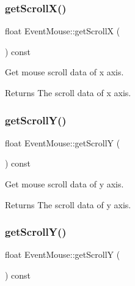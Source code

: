 \subsubsection{\texorpdfstring{get\+Scroll\+X()}{getScrollX()}\hspace{0.1cm}{\footnotesize\ttfamily [2/2]}}
{\footnotesize\ttfamily float Event\+Mouse\+::get\+ScrollX (\begin{DoxyParamCaption}{ }\end{DoxyParamCaption}) const\hspace{0.3cm}{\ttfamily [inline]}}

Get mouse scroll data of x axis.

\begin{DoxyReturn}{Returns}
The scroll data of x axis. 
\end{DoxyReturn}
\mbox{\label{classEventMouse_ad0670c5295d1972f2b9ccb85d9d23849}} 
\subsubsection{\texorpdfstring{get\+Scroll\+Y()}{getScrollY()}\hspace{0.1cm}{\footnotesize\ttfamily [1/2]}}
{\footnotesize\ttfamily float Event\+Mouse\+::get\+ScrollY (\begin{DoxyParamCaption}{ }\end{DoxyParamCaption}) const\hspace{0.3cm}{\ttfamily [inline]}}

Get mouse scroll data of y axis.

\begin{DoxyReturn}{Returns}
The scroll data of y axis. 
\end{DoxyReturn}
\mbox{\label{classEventMouse_ad0670c5295d1972f2b9ccb85d9d23849}} 
\subsubsection{\texorpdfstring{get\+Scroll\+Y()}{getScrollY()}\hspace{0.1cm}{\footnotesize\ttfamily [2/2]}}
{\footnotesize\ttfamily float Event\+Mouse\+::get\+ScrollY (\begin{DoxyParamCaption}{ }\end{DoxyParamCaption}) const\hspace{0.3cm}{\ttfamily [inline]}}

